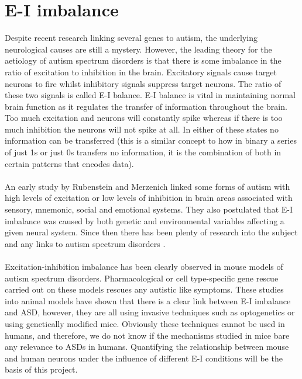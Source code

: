 \documentclass{epsrc}
\begin{document}
\section{E-I imbalance}
\noindent
Despite recent research linking several genes to autism, the underlying neurological causes are still a mystery. However, the leading theory for the aetiology of autism spectrum disorders is that there is some imbalance in the ratio of excitation to inhibition in the brain. Excitatory signals cause target neurons to fire whilst inhibitory signals suppress target neurons. The ratio of these two signals is called E-I balance. E-I balance is vital in maintaining normal brain function as it regulates the transfer of information throughout the brain. Too much excitation and neurons will constantly spike whereas if there is too much inhibition the neurons will not spike at all. In either of these states no information can be transferred (this is a similar concept to how in binary a series of just 1s or just 0s transfers no information, it is the combination of both in certain patterns that encodes data).
\\\\
An early study by Rubenstein and Merzenich \cite{rubenstein2003model} linked some forms of autism with high levels of excitation or low levels of inhibition in brain areas associated with sensory, mnemonic, social and emotional systems. They also postulated that E-I imbalance was caused by both genetic and environmental variables affecting a given neural system. Since then there has been plenty of research into the subject and any links to autism spectrum disorders \cite{gogolla2009common, nelson2015excitatory, cellot2014gabaergic}.
\\\\
Excitation-inhibition imbalance has been clearly observed in mouse models of autism spectrum disorders. Pharmacological or cell type-specific gene rescue carried out on these models rescues any autistic like symptoms. These studies into animal models have shown that there is a clear link between E-I imbalance and ASD, however, they are all using invasive techniques such as optogenetics or using genetically modified mice. Obviously these techniques cannot be used in humans, and therefore, we do not know if the mechanisms studied in mice bare any relevance to ASDs in humans. Quantifying the relationship between mouse and human neurons under the influence of different E-I conditions will be the basis of this project. 
\\
\end{document}
